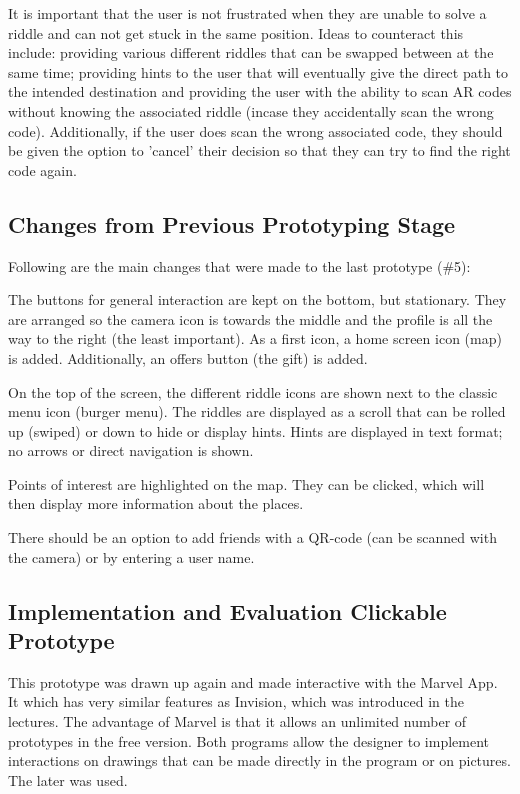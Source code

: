 \documentclass[10pt,twocolumn]{article} %
\begin{document}
It is important that the user is not frustrated when they are unable to solve a riddle and can not get stuck in the same position. Ideas to counteract this include: providing various different riddles that can be swapped between at the same time; providing hints to the user that will eventually give the direct path to the intended destination and providing the user with the ability to scan AR codes without knowing the associated riddle (incase they accidentally scan the wrong code). Additionally, if the user does scan the wrong associated code, they should be given the option to 'cancel' their decision so that they can try to find the right code again.

\subsection*{Changes from Previous Prototyping Stage}
Following are the main changes that were made to the last prototype (\#5): 

The buttons for general interaction are kept on the bottom, but stationary. They are arranged so the camera icon is towards the middle and the profile is all the way to the right (the least important). As a first icon, a home screen icon (map) is added. Additionally, an offers button (the gift) is added. 

On the top of the screen, the different riddle icons are shown next to the classic menu icon (burger menu). The riddles are displayed as a scroll that can be rolled up (swiped) or down to hide or display hints. Hints are displayed in text format; no arrows or direct navigation is shown.

Points of interest are highlighted on the map. They can be clicked, which will then display more information about the places.

There should be an option to add friends with a QR-code (can be scanned with the camera) or by entering a user name. 

\subsection*{Implementation and Evaluation Clickable Prototype}
This prototype was drawn up again and made interactive with the Marvel App. It which has very similar features as Invision, which was introduced in the lectures. The advantage of Marvel is that it allows an unlimited number of prototypes in the free version. Both programs allow the designer to implement interactions on drawings that can be made directly in the program or on pictures. The later was used.
\end{document}
